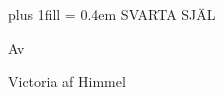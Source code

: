 

{%
    \parindent=0pt%
    \leftskip 0pt plus 1fill\relax
    \rightskip=\leftskip
    \parfillskip=0pt\relax
    \baselineskip
    {
        \scalemain\typoscale[2074/2074]%
        \currvar
        \spaceskip0.4em\relax
        SVARTA SJÄL
    }\par
    \baselineskip
    {
        \scalemain\typoscale[1440/1440]%
        Av
    }\par
    \baselineskip
    {
        \scalemain\typoscale[2074/2074]%
        Victoria af Himmel
    }\par
}
